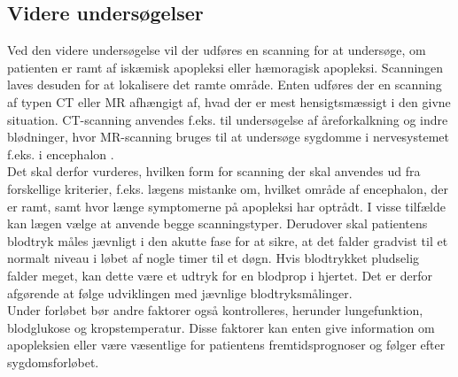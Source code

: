\subsection{Videre undersøgelser}
Ved den videre undersøgelse vil der udføres en scanning for at undersøge, om patienten er ramt af iskæmisk apopleksi eller hæmoragisk apopleksi. Scanningen laves desuden for at lokalisere det ramte område. Enten udføres der en scanning af typen CT eller MR afhængigt af, hvad der er mest hensigtsmæssigt i den givne situation. \cite{Sundhedsstyrelsen2009} %
CT-scanning anvendes f.eks. til undersøgelse af åreforkalkning og indre blødninger, hvor MR-scanning bruges til at undersøge sygdomme i nervesystemet f.eks. i encephalon \cite{Hansen2015,Ammundsen2015}.\\
Det skal derfor vurderes, hvilken form for scanning der skal anvendes ud fra forskellige kriterier, f.eks. lægens mistanke om, hvilket område af encephalon, der er ramt, samt hvor længe symptomerne på apopleksi har optrådt. I visse tilfælde kan lægen vælge at anvende begge scanningstyper.  
Derudover skal patientens blodtryk måles jævnligt i den akutte fase for at sikre, at det falder gradvist til et normalt niveau i løbet af nogle timer til et døgn. Hvis blodtrykket pludselig falder meget, kan dette være et udtryk for en blodprop i hjertet. Det er derfor afgørende at følge udviklingen med jævnlige blodtryksmålinger. \cite{Sundhedsstyrelsen2009}
\\
Under forløbet bør andre faktorer også kontrolleres, herunder lungefunktion, blodglukose og kropstemperatur. Disse faktorer kan enten give information om apopleksien eller være væsentlige for patientens fremtidsprognoser og følger efter sygdomsforløbet. \cite{Sundhedsstyrelsen2009}
\\

